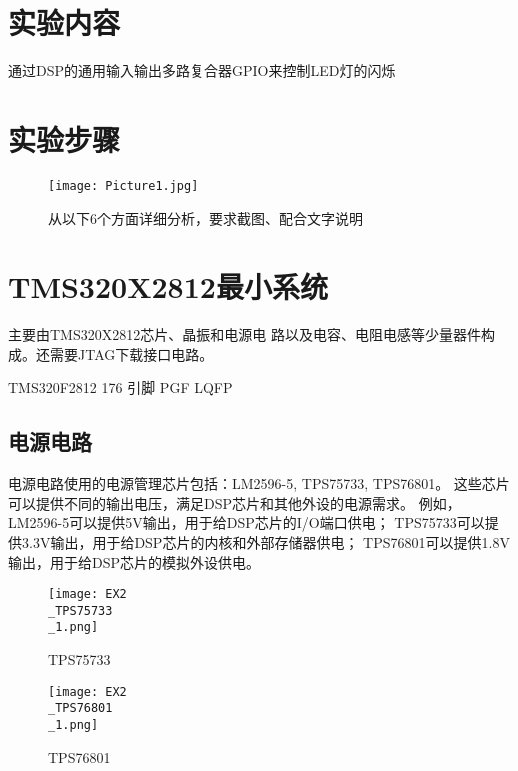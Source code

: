 \documentclass{math201}
\begin{document}

\makecover


\section{实验内容}

通过DSP的通用输入输出多路复合器GPIO来控制LED灯的闪烁

\section{实验步骤}

\begin{figure}[H]  
    \centering\texttt{[image: Picture1.jpg]}  
    \caption{从以下6个方面详细分析，要求截图、配合文字说明}     
\end{figure}

\section{TMS320X2812最小系统}

主要由TMS320X2812芯片、晶振和电源电 路以及电容、电阻电感等少量器件构成。还需要JTAG下载接口电路。

TMS320F2812 176 引脚 PGF LQFP

\subsection{电源电路}

电源电路使用的电源管理芯片包括：LM2596-5, TPS75733, TPS76801。
这些芯片可以提供不同的输出电压，满足DSP芯片和其他外设的电源需求。
例如，LM2596-5可以提供5V输出，用于给DSP芯片的I/O端口供电；
TPS75733可以提供3.3V输出，用于给DSP芯片的内核和外部存储器供电；
TPS76801可以提供1.8V输出，用于给DSP芯片的模拟外设供电。

\begin{figure}[H]  
  \centering\texttt{[image: EX2\\\_TPS75733\\\_1.png]}  
  \caption{TPS75733}     
\end{figure}

\begin{figure}[H]  
  \centering\texttt{[image: EX2\\\_TPS76801\\\_1.png]}  
  \caption{TPS76801}     
\end{figure}
\end{document}
